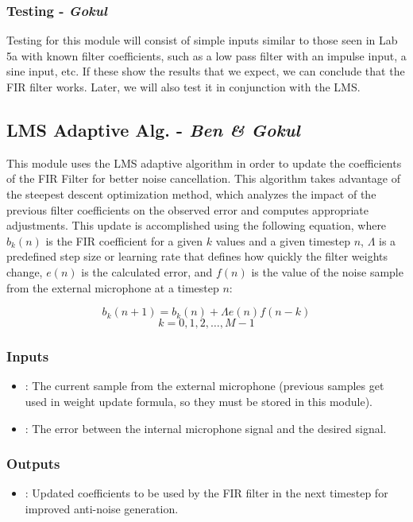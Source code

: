 \documentclass{fpgairpods}
\begin{document}
\begin{multicols*}{2}
\subsubsection{Testing - \textit{Gokul}}
Testing for this module will consist of simple inputs similar to those seen in Lab 5a with known filter coefficients, such as a low pass filter with an impulse input, a sine input, etc. If these show the results that we expect, we can conclude that the FIR filter works. Later, we will also test it in conjunction with the LMS.

\subsection{LMS Adaptive Alg. - \textit{Ben \& Gokul}}
This module uses the LMS adaptive algorithm in order to update the coefficients of the FIR Filter for better noise cancellation. This algorithm takes advantage of the steepest descent optimization method, which analyzes the impact of the previous filter coefficients on the observed error and computes appropriate adjustments. This update is accomplished using the following equation\cite{lmsfilter}, where $b_k(n)$ is the FIR coefficient for a given $k$ values and a given timestep $n$, $\Lambda$ is a predefined step size or learning rate that defines how quickly the filter weights change, $e(n)$ is the calculated error, and $f(n)$ is the value of the noise sample from the external microphone at a timestep $n$:

\[ b_k(n + 1) = b_k(n) + \Lambda e(n)f(n-k) \]
\[ k = 0, 1, 2,\ldots,  M-1 \]

\subsubsection{Inputs}
\begin{itemize}
    \item {}: The current sample from the external microphone (previous samples get used in weight update formula, so they must be stored in this module).
    \item {}: The error between the internal microphone signal and the desired signal.
\end{itemize}
\subsubsection{Outputs}
\begin{itemize}
    \item {}: Updated coefficients to be used by the FIR filter in the next timestep for improved anti-noise generation.
\end{itemize}

\end{multicols*}
\end{document}
